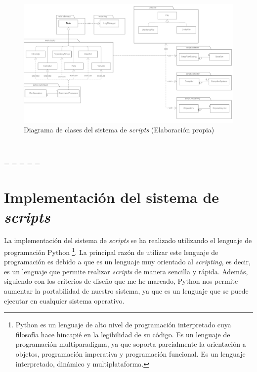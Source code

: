 \begin{figure}[H]
    \begin{center}
        \includegraphics[scale=0.2]{figuras/Capitulo_07/UML_Script.png}
    \end{center}
    \caption[Diagrama de clases del sistema de \textit{scripts}]{Diagrama de clases del sistema de \textit{scripts} (Elaboración propia)}
    \label{fig:UML_Script}
\end{figure}\

\newpage
\paperwidth=\pdfpageheight
\paperheight=\pdfpagewidth
\pdfpageheight=\paperheight
\pdfpagewidth=\paperwidth
\headwidth=\textwidth

\section{Implementación del sistema de \textit{scripts}}
\label{sec:implementacion_sistema_scripts}


La implementación del sistema de \textit{scripts} se ha realizado utilizando el lenguaje de programación Python
\footnote{Python es un lenguaje de alto nivel de programación interpretado cuya filosofía hace hincapié
en la legibilidad de su código. Es un lenguaje de programación multiparadigma, ya que soporta parcialmente
la orientación a objetos, programación imperativa y programación funcional. Es un lenguaje interpretado,
dinámico y multiplataforma. }. La principal razón de utilizar este lenguaje de programación es debido a
que es un lenguaje muy orientado al \textit{scripting}, es decir, es un lenguaje que permite realizar
\textit{scripts} de manera sencilla y rápida. Además, siguiendo con los criterios de diseño que me he marcado,
Python nos permite aumentar la portabilidad de nuestro sistema, ya que es un lenguaje que se puede ejecutar
en cualquier sistema operativo.

